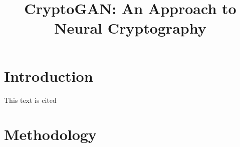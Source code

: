 \documentclass[12pt]{article}
\title{CryptoGAN: An Approach to Neural Cryptography}
\author{
  \IEEEauthorblockN{Alisamar Husain}
  \IEEEauthorblockA{
    Jamia Millia Islamia University\\
    New Delhi, India
  }
}
\begin{document}
  \maketitle

  \begin{abstract}
    \lipsum[1]
  \end{abstract}
 
  \section{Introduction}
  \lipsum[1]

  This text is cited \cite{visualloss}

  \section{Methodology}
  \lipsum
\end{document}
